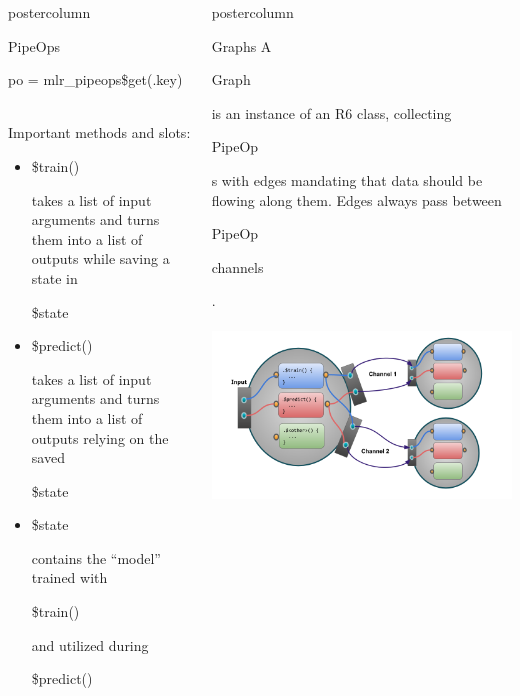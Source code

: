 \documentclass{beamer}
\newlength{\columnheight} %
\newcommand{\codeinline}[1]{\begin{codeboxinline}#1\end{codeboxinline}}
\begin{document}
\begin{frame}[fragile]{}
\begin{columns}
\begin{column}{.245\textwidth}
\begin{beamercolorbox}[center]{postercolumn}
\begin{minipage}{.98\textwidth}
{\begin{myblock}{PipeOps}
\begin{codebox}
                po = mlr\_pipeops\$get(.key)
              \end{codebox}
              \ \\
              Important methods and slots:
              \begin{itemize}
                \item \codeinline{\$train()} takes a list of input arguments and turns them into a list of outputs while saving a state in \codeinline{\$state}
                \item \codeinline{\$predict()} takes a list of input arguments and turns them into a list of outputs relying on the saved \codeinline{\$state}
                \item \codeinline{\$state} contains the ``model'' trained with \codeinline{\$train()} and utilized during \codeinline{\$predict()}
              \end{itemize}
						\end{myblock}
						\vfill}
				\end{minipage}
			\end{beamercolorbox}
		\end{column}
		\begin{column}{.245\textwidth}
			\begin{beamercolorbox}[center]{postercolumn}
				\begin{minipage}{.98\textwidth}
					\parbox[t][\columnheight]{\textwidth}{
						\begin{myblock}{Graphs}
              A \codeinline{Graph} is an instance of an R6 class, collecting \codeinline{PipeOp}s with edges mandating that data should be flowing along them. Edges always pass between \codeinline{PipeOp} \codeinline{channels}.
              \\
              \\
              \includegraphics[width=\textwidth]{img/po_multi_viz.png}

\end{myblock}}
\end{minipage}
\end{beamercolorbox}
\end{column}
\end{columns}
\end{frame}
\end{document}
